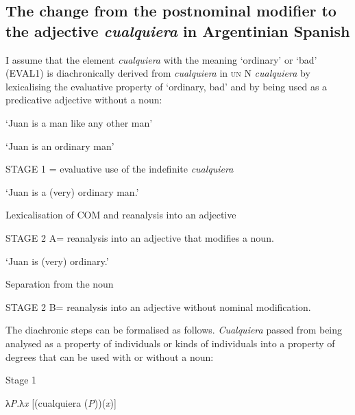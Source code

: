 \subsection{{The} {change} {from} {the} {postnominal} {modifier} {to} {the} {adjective} {\textit{cualquiera}} {in} {Argentinian Spanish}} \label{sec:4.5.1}

I assume that the element \textit{cualquiera} with the meaning ‘ordinary’ or ‘bad’ (EVAL1) is diachronically derived from \textit{cualquiera} in \textsc{un} N \textit{cualquiera} by lexicalising the evaluative property of ‘ordinary, bad’ and by being used as a predicative adjective without a noun:

\glt ‘Juan is a man like any other man’

\glt ‘Juan is an ordinary man’

STAGE 1 = evaluative use of the indefinite \textit{cualquiera}
\z 

\glt ‘Juan is a (very) ordinary man.’ 

Lexicalisation of COM and reanalysis into an adjective

STAGE 2 A= reanalysis into an adjective that modifies a noun.
\z 

\glt ‘Juan is (very) ordinary.’ 

Separation from the noun

STAGE 2 B= reanalysis into an adjective without nominal modification.
\z

The diachronic steps can be formalised as follows. \textit{Cualquiera} passed from being analysed as a property of individuals or kinds of individuals into a property of degrees that can be used with or without a noun:

\ea \label{ex:key:226} %

\ea Stage 1

     λ\textit{P}.λ\textit{x\textsubscript{} }[(cualquiera (\textit{P}))(\textit{x})]

